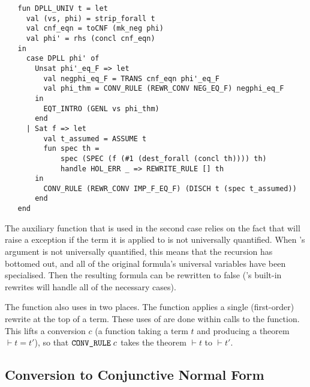 \begin{hol}
\begin{verbatim}
   fun DPLL_UNIV t = let
     val (vs, phi) = strip_forall t
     val cnf_eqn = toCNF (mk_neg phi)
     val phi' = rhs (concl cnf_eqn)
   in
     case DPLL phi' of
       Unsat phi'_eq_F => let
         val negphi_eq_F = TRANS cnf_eqn phi'_eq_F
         val phi_thm = CONV_RULE (REWR_CONV NEG_EQ_F) negphi_eq_F
       in
         EQT_INTRO (GENL vs phi_thm)
       end
     | Sat f => let
         val t_assumed = ASSUME t
         fun spec th =
             spec (SPEC (f (#1 (dest_forall (concl th)))) th)
             handle HOL_ERR _ => REWRITE_RULE [] th
       in
         CONV_RULE (REWR_CONV IMP_F_EQ_F) (DISCH t (spec t_assumed))
       end
   end
\end{verbatim}
\end{hol}

The auxiliary function  that is used in the second case
relies on the fact that  will raise a 
exception if the term it is applied to is not universally quantified.
When 's argument is not universally quantified, this means
that the recursion has bottomed out, and all of the original formula's
universal variables have been specialised.  Then the resulting formula
can be rewritten to false ('s built-in rewrites will
handle all of the necessary cases).

The  function also uses  in two places.
The  function applies a single (first-order) rewrite at
the top of a term.  These uses of  are done within
calls to the  function.  This lifts a conversion $c$ (a
function taking a term $t$ and producing a theorem $\vdash t = t'$),
so that $\ml{CONV\_RULE}\;c$ takes the theorem $\vdash t$ to $\vdash t'$.


\subsection{Conversion to Conjunctive Normal Form}
\label{sec:conv-conj-norm}

